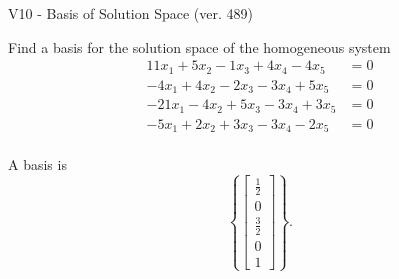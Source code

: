 \begin{exercise}
  \begin{exerciseTitle}V10 - Basis of Solution Space (ver. 489)\end{exerciseTitle}
  \begin{exerciseStatement}
    Find a basis for the solution space of the homogeneous system 
\begin{align*}
 11 x_ 1 + 5 x_ 2 -1 x_ 3 + 4 x_ 4 -4 x_ 5 &= 0  \\ 
  -4 x_ 1 + 4 x_ 2 -2 x_ 3 -3 x_ 4 + 5 x_ 5 &= 0  \\ 
  -21 x_ 1 -4 x_ 2 + 5 x_ 3 -3 x_ 4 + 3 x_ 5 &= 0  \\ 
  -5 x_ 1 + 2 x_ 2 + 3 x_ 3 -3 x_ 4 -2 x_ 5 &= 0  \\ 
 \end{align*}


 
  \end{exerciseStatement}

  \begin{exerciseAnswer}
   A basis is   
\[\left\{\left[\begin{array}{c}
\frac{1}{2} \\
0 \\
\frac{3}{2} \\
0 \\
1
\end{array}\right]\right\}.\]

  


  \end{exerciseAnswer}
\end{exercise}